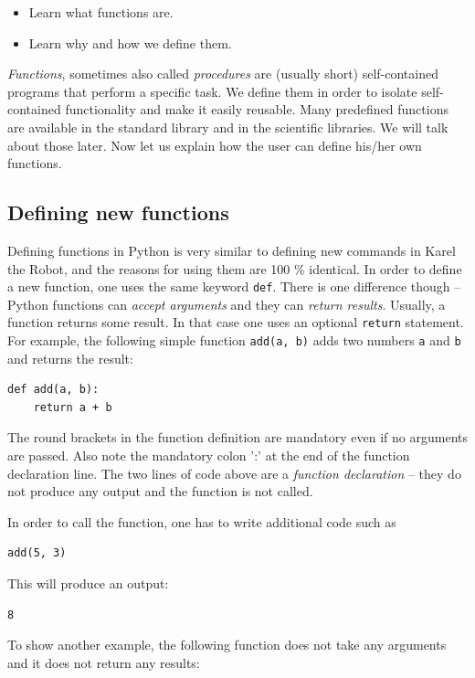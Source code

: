 \begin{itemize}
\item Learn what functions are.
\item Learn why and how we define them.
\end{itemize}
{\em Functions}, sometimes also called {\em procedures} are (usually short) self-contained programs that perform a specific task. 
We define them in order to isolate self-contained functionality and make it easily reusable.
Many predefined functions are available in the standard library and in the scientific libraries. 
We will talk about those later. Now let us explain how the user can define his/her own functions.

\subsection{Defining new functions}

Defining functions in Python is very similar to defining new commands 
in Karel the Robot, and the reasons for using them are 100 \% identical.
In order to define a new function, one uses the same keyword {\tt def}.
There is one difference though -- Python functions can {\em accept arguments} and 
they can {\em return results}. Usually, a function returns 
some result. In that case one uses an optional {\tt return} statement. For example, 
the following simple function {\tt add(a, b)} adds two numbers {\tt a} and {\tt b} 
and returns the result:

\begin{verbatim}
def add(a, b):
    return a + b
\end{verbatim}
The round brackets in the function definition are mandatory even if no arguments are passed.
Also note the mandatory colon ':' at the end of the function declaration line. The two lines of code above 
are a {\em function declaration} -- they do not produce any output and the function is not called. 

In order to call the function, one has to write additional code such as

\begin{verbatim}
add(5, 3)
\end{verbatim}
This will produce an output:

\begin{verbatim}
8
\end{verbatim}
To show another example, the following function does not take any arguments 
and it does not return any results:


